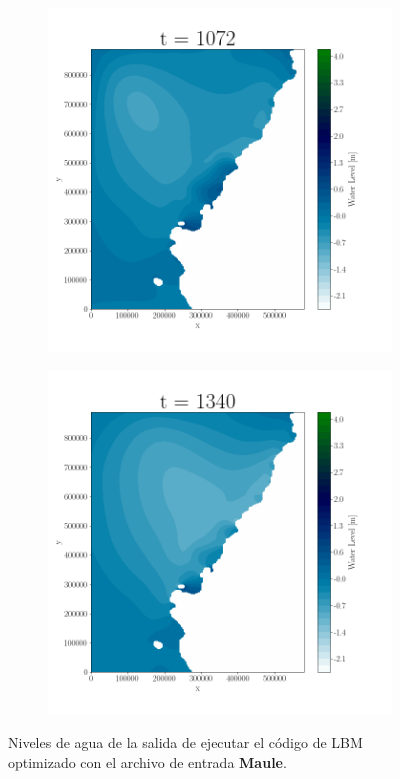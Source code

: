 \begin{figure}[H]
\begin{subfigure}[b]{.4\linewidth}
\includegraphics[width=\linewidth]{Figures/2-5.png}
\caption{}
\end{subfigure}
\begin{subfigure}[b]{.4\linewidth}
\includegraphics[width=\linewidth]{Figures/2-6.png}
\caption{}
\end{subfigure}
\caption{Niveles de agua de la salida de ejecutar el código de LBM optimizado con el archivo de entrada \textbf{Maule}.}
\label{fig:21}
\end{figure}

